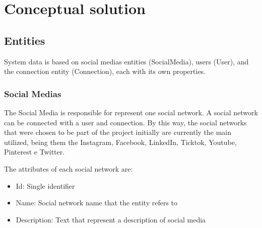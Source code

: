 \chapter{Conceptual solution}




\section{Entities}
System data is based on social medias entities (SocialMedia), users (User), and the connection entity (Connection), each with its own properties.

\subsection{Social Medias}  
    
The Social Media is responsible for represent one social network. A social network can be connected with a user and connection. By this way, the social networks that were chosen to be part of the project initially are currently the main utilized, being them the Instagram, Facebook, LinkedIn, Ticktok, Youtube, Pinterest e Twitter.

The attributes of each social network are:


\begin{itemize}

\item Id: Single identifier

\item Name: Social network name that the entity refers to 

\item Description: Text that represent a description of social media

\end{itemize}


